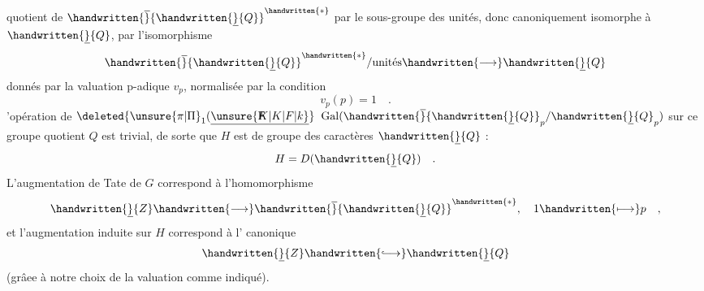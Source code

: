 quotient de $\handwritten{\overline}{\handwritten{\underline}{Q}}^{\handwritten{*}}$ par le sous-groupe des unités, donc canoniquement isomorphe à $\handwritten{\underline}{Q}$, par l'isomorphisme
\[
\handwritten{\overline}{\handwritten{\underline}{Q}}^{\handwritten{*}}/\text{unités}\handwritten{\longrightarrow}\handwritten{\underline}{Q}
\]
donnés par la valuation p-adique $v_p$, normalisée par la condition
\[
v_p(p)=1\quad .
\]
'opération de $\deleted{\unsure{\pi|\Pi}_1(\underline{\unsure{\rlap{F}K|K|F|k}}}$ $\operatorname{Gal}(\handwritten{\overline}{\handwritten{\underline}{Q}}_p/\handwritten{\underline}{Q}_p)$ sur ce groupe quotient $Q$ est trivial, de sorte que $H$ est  de groupe des caractères $\handwritten{\underline}{Q}$ :
\[
H=D(\handwritten{\underline}{Q})\quad .
\]
L'augmentation de Tate de $G$ correspond à l'homomorphisme
\[
\handwritten{\underline}{Z}\handwritten{\longrightarrow}\handwritten{\overline}{\handwritten{\underline}{Q}}^{\handwritten{*}},\quad 1\handwritten{\longmapsto}p\quad ,
\]
et l'augmentation induite sur $H$ correspond à l' canonique
\[
\handwritten{\underline}{Z}\handwritten{\lhook\joinrel\longrightarrow}\handwritten{\underline}{Q}
\]
(grâee à notre choix de la valuation  comme indiqué).

